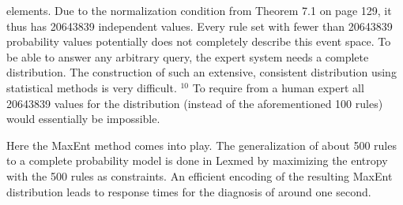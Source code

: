 \documentclass[10pt]{book}
\begin{document}
elements. Due to the normalization condition from Theorem 7.1 on page 129, it thus has 20643839 independent values. Every rule set with fewer than 20643839 probability values potentially does not completely describe this event space. To be able to answer any arbitrary query, the expert system needs a complete distribution. The construction of such an extensive, consistent distribution using statistical methods is very difficult. ${ }^{10}$ To require from a human expert all 20643839 values for the distribution (instead of the aforementioned 100 rules) would essentially be impossible.

Here the MaxEnt method comes into play. The generalization of about 500 rules to a complete probability model is done in Lexmed by maximizing the entropy with the 500 rules as constraints. An efficient encoding of the resulting MaxEnt distribution leads to response times for the diagnosis of around one second.
\end{document}
